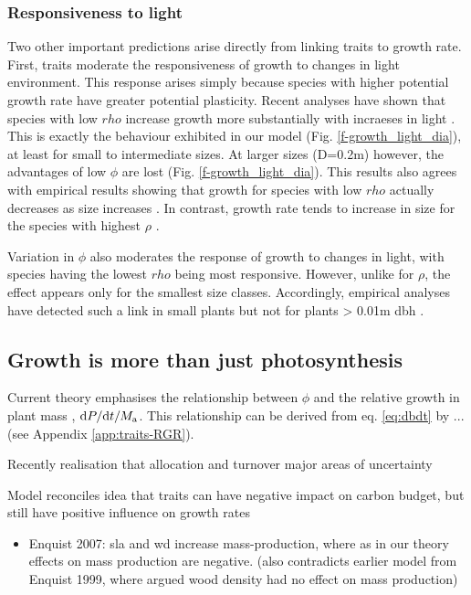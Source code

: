 \documentclass[12pt, a4paper]{article}
\begin{document}
\subsubsection{Responsiveness to light}

Two other important predictions arise directly from linking traits to
growth rate. First, traits moderate the
responsiveness of growth to changes in light environment. This response
arises simply because species with higher potential growth rate have
greater potential plasticity. Recent analyses have shown that species
with low $rho$ increase growth more substantially with incraeses in
light \citep{ruger-2012}. This is exactly the behaviour
exhibited in our model (Fig. \ref{f-growth_light_dia}), at least for small
to intermediate sizes. At larger sizes (D=0.2m) however, the advantages
of low $\phi$ are lost (Fig. \ref{f-growth_light_dia}). This results also
agrees with empirical results showing that growth for species with low
$rho$ actually decreases as size
increases \citep{ruger-2012}. In contrast, growth rate tends
to increase in size for the species with highest
$\rho$ \citep{ruger-2012}.


Variation in $\phi$ also moderates the response of growth to changes
in light, with species having the lowest $rho$ being most responsive.
However, unlike for $\rho$, the effect appears only for the smallest
size classes. Accordingly, empirical analyses have detected such a link
in small plants but not for plants \textgreater{} 0.01m
dbh \citep{ruger-2012}.

\subsection{Growth is more than just photosynthesis}\label{tree-growth-is-more-than-just-photosynthesis}

Current theory emphasises the relationship between $\phi$ and the relative growth in plant mass
\citep{lambers-1992, cornelissen-1996, wright_cross-2000,  enquist-2007},
${\rm d}P / {\rm d}t / M_{\rm a}$. This relationship can be derived from eq. \ref{eq:dbdt}  by ...
(see Appendix \ref{app:traits-RGR}).

Recently realisation that allocation and turnover major areas of
uncertainty

Model reconciles idea that traits can have negative impact on carbon
budget, but still have positive influence on growth rates

\begin{itemize}
\itemsep1pt\parskip0pt
\item
  Enquist 2007: sla and wd increase mass-production, where as in our
  theory effects on mass production are negative. (also contradicts
  earlier model from Enquist 1999, where argued wood density had no
  effect on mass production)
\end{itemize}
\end{document}

